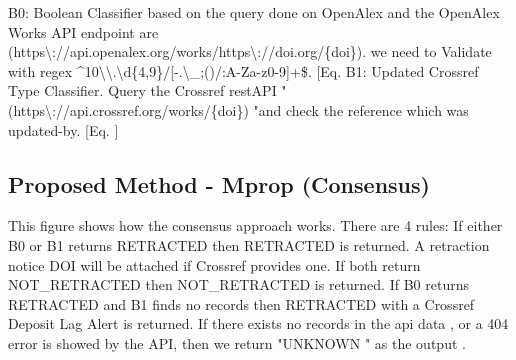\documentclass[10pt,a4paper,twocolumn]{article}
\begin{document}
B0: Boolean Classifier based on the query done on OpenAlex and the OpenAlex Works API endpoint are (https\textbackslash{}:/\hspace{0pt}/\hspace{0pt}api.\hspace{0pt}openalex.\hspace{0pt}org/\hspace{0pt}works/\hspace{0pt}https\textbackslash{}:/\hspace{0pt}/\hspace{0pt}doi.\hspace{0pt}org/\hspace{0pt}\{doi\}).\hspace{0pt} we need to Validate with regex \textasciicircum{}10\textbackslash{}\textbackslash{}.\hspace{0pt}\textbackslash{}d\{4,9\}/\hspace{0pt}[-.\hspace{0pt}\textbackslash{}\_;()/\hspace{0pt}:A-Za-z0-9]+\$.\hspace{0pt} [Eq.\hspace{0pt} B1: Updated Crossref Type Classifier.\hspace{0pt} Query the Crossref restAPI "(https\textbackslash{}:/\hspace{0pt}/\hspace{0pt}api.\hspace{0pt}crossref.\hspace{0pt}org/\hspace{0pt}works/\hspace{0pt}\{doi\}) "and check the reference which was updated-by.\hspace{0pt} [Eq.\hspace{0pt} ]


\subsection{Proposed Method - Mprop (Consensus)}

This figure shows how the consensus approach works. There are 4 rules: If either B0 or B1 returns RETRACTED then RETRACTED is returned. A retraction notice DOI will be attached if Crossref provides one. If both return NOT\_RETRACTED then NOT\_RETRACTED is returned. If B0 returns RETRACTED and B1 finds no records then RETRACTED with a Crossref Deposit Lag Alert is returned. If there exists no records in the api data , or a 404 error is showed by the API, then we return "UNKNOWN " as the output .
\end{document}
